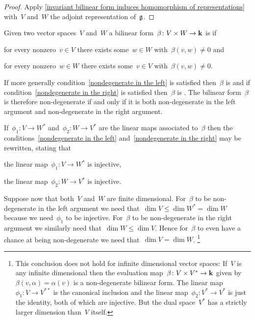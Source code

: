 \begin{proof}
  Apply \cref{invariant bilinear form induces homomorphism of representations} with~$V$ and~$W$ the adjoint representation of~$\mathfrak{g}$.
\end{proof}


\begin{recall}
  Given two vector spaces~$V$ and~$W$ a bilinear form~$\beta \colon V \times W \to \mathbf{k}$ is  if
  \begin{equivalenceslist}
    \item
      \label{nondegenerate in the left}
      for every nonzero~$v \in V$ there exists some~$w \in W$ with~$\beta(v,w) \neq 0$ and
    \item
      \label{nondegenerate in the right}
      for every nonzero~$w \in W$ there exists some~$v \in V$ with~$\beta(v,w) \neq 0$.
  \end{equivalenceslist}
  If more generally condition~\ref*{nondegenerate in the left} is satisfied then~$\beta$ is  and if condition~\ref*{nondegenerate in the right} is satisfied then~$\beta$ is .
  The bilinear form~$\beta$ is therefore non-degenerate if and only if it is both non-degenerate in the left argument and non-degenerate in the right argument.
  
  If~$\phi_1 \colon V \to W^*$ and~$\phi_2 \colon W \to V^*$ are the linear maps associated to~$\beta$ then the conditions~\ref*{nondegenerate in the left} and~\ref*{nondegenerate in the right} may be rewritten, stating that
  \begin{equivalenceslist}[label = \roman*')]
    \item
      the linear map~$\phi_1 \colon V \to W^*$ is injective,
    \item
      the linear map~$\phi_2 \colon W \to V^*$ is injective.
  \end{equivalenceslist}
  
  Suppose now that both~$V$ and~$W$ are finite dimensional.
  For~$\beta$ to be non-degenerate in the left argument we need that~$\dim V \leq \dim W^* = \dim W$ because we need~$\phi_1$ to be injective.
  For~$\beta$ to be non-degenerate in the right argument we similarly need that~$\dim W \leq \dim V$.
  Hence for~$\beta$ to even have a chance at being non-degenerate we need that~$\dim V = \dim W$.%
  \footnote{
  This conclusion does not hold for infinite dimensional vector spaces:
  If~$V$ is any infinite dimensional then the evaluation map~$\beta \colon V \times V^* \to \mathbf{k}$ given by~$\beta(v,\alpha) = \alpha(v)$ is a non-degenerate bilinear form.
  The linear map~$\phi_1 \colon V \to V^{**}$ is the canonical inclusion and the linear map~$\phi_2 \colon V^* \to V^*$ is just the identity, both of which are injective.
  But the dual space~$V^*$ has a strictly larger dimension than~$V$ itself.}
  

\end{recall}
